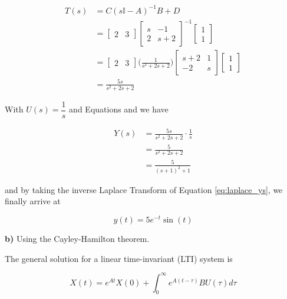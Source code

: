 \begin{align}
  T(s) &= C (s\mathbb{I} - A)^{-1} B + D \nonumber \\
       &=
       \begin{bmatrix}
        2 & 3
       \end{bmatrix}
       \begin{bmatrix}
        s & -1 \\
        2 & s + 2
      \end{bmatrix}^{-1}
      \begin{bmatrix}
       1 \\ 1
      \end{bmatrix} \nonumber \\
      &=
      \begin{bmatrix}
       2 & 3
      \end{bmatrix}
      \Bigg(\frac{1}{s^2 + 2s + 2} \Bigg)
      \begin{bmatrix}
       s + 2 & 1 \\
       -2     & s
      \end{bmatrix}
      \begin{bmatrix}
       1 \\ 1
      \end{bmatrix} \nonumber \\
      &= \frac{5s}{s^2 + 2s + 2} \label{eq:laplace_tf}
\end{align}

With $U(s) = \dfrac{1}{s}$ and Equations \label{eq:laplace_output_tf} and
\label{eq:laplace_tf} we have

\begin{align}
  Y(s) &= \frac{5s}{s^2 + 2s + 2} \cdot \frac{1}{s} \nonumber \\
       &= \frac{5}{s^2 + 2s + 2} \nonumber \\
       &= \frac{5}{(s + 1)^2 + 1} \label{eq:laplace_ys}
\end{align}

\noindent and by taking the inverse Laplace Transform of Equation
\ref{eq:laplace_ys}, we finally arrive at

\begin{equation} \label{eq:5_solved_laplace}
  y(t) = 5e^{-t} \sin (t)
\end{equation}

\noindent \textbf{b)} Using the Cayley-Hamilton theorem.

The general solution for a linear time-invariant (LTI) system is

\begin{equation} \label{eq:lti_gen_sol}
  X(t) = e^{At}X(0) + \int_0^{\infty} e^{A(t - \tau)} B U(\tau) d \tau
\end{equation}

